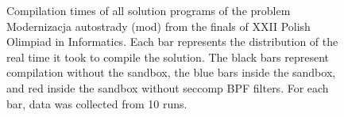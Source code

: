 \documentclass[en]{pracamgr}
\begin{document}
\begin{appendices}
\begin{figure}[H]
\caption{Compilation times of all solution programs of the problem Modernizacja autostrady (mod) from the finals of XXII Polish Olimpiad in Informatics. Each bar represents the distribution of the real time it took to compile the solution. The black bars represent compilation without the sandbox, the blue bars inside the sandbox, and red inside the sandbox without seccomp BPF filters. For each bar, data was collected from 10 runs.}
\label{figure:mod_compilation_real_time}
\end{figure}


\end{appendices}
\end{document}
